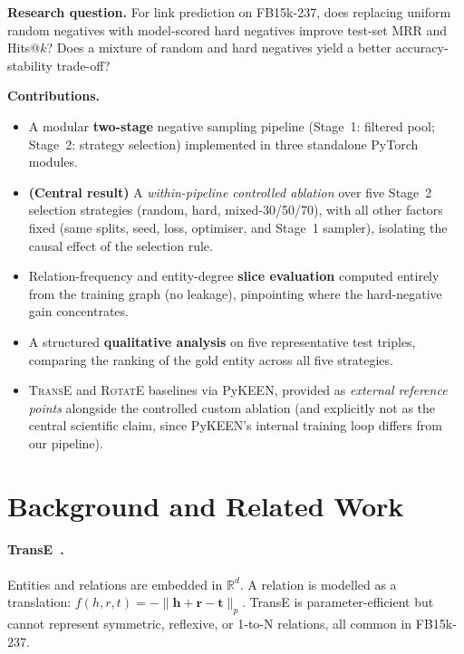 \documentclass[10pt,twocolumn,letterpaper]{article}
\begin{document}
\textbf{Research question.} For link prediction on FB15k-237, does replacing
uniform random negatives with model-scored hard negatives improve test-set MRR
and Hits@$k$? Does a mixture of random and hard negatives yield a better
accuracy-stability trade-off?

\textbf{Contributions.}
\begin{itemize}
  \item A modular \textbf{two-stage} negative sampling pipeline (Stage~1:
    filtered pool; Stage~2: strategy selection) implemented in three
    standalone PyTorch modules.
  \item \textbf{(Central result)} A \emph{within-pipeline controlled
    ablation} over five Stage~2 selection strategies (random, hard,
    mixed-30/50/70), with all other factors fixed (same splits, seed,
    loss, optimiser, and Stage~1 sampler), isolating the causal effect of
    the selection rule.
  \item Relation-frequency and entity-degree \textbf{slice evaluation}
    computed entirely from the training graph (no leakage), pinpointing
    where the hard-negative gain concentrates.
  \item A structured \textbf{qualitative analysis} on five representative
    test triples, comparing the ranking of the gold entity across all five
    strategies.
  \item \textsc{TransE} and \textsc{RotatE} baselines via PyKEEN, provided
    as \emph{external reference points} alongside the controlled custom
    ablation (and explicitly not as the central scientific claim, since
    PyKEEN's internal training loop differs from our pipeline).
\end{itemize}

\section{Background and Related Work}
\label{sec:background}

\paragraph{TransE~\cite{bordes2013translating}.}
Entities and relations are embedded in $\mathbb{R}^d$. A relation is modelled as
a translation: $f(h,r,t)=-\|\mathbf{h}+\mathbf{r}-\mathbf{t}\|_p$. TransE is
parameter-efficient but cannot represent symmetric, reflexive, or 1-to-N
relations, all common in FB15k-237.
\end{document}
